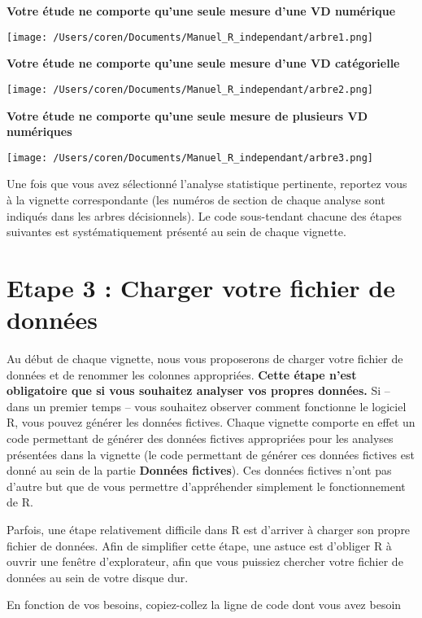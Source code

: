 \documentclass[
]{book}
\begin{document}
\textbf{Votre étude ne comporte qu'une seule mesure d'une VD numérique}

\texttt{[image: /Users/coren/Documents/Manuel\_R\_independant/arbre1.png]}

\textbf{Votre étude ne comporte qu'une seule mesure d'une VD catégorielle}

\texttt{[image: /Users/coren/Documents/Manuel\_R\_independant/arbre2.png]}

\textbf{Votre étude ne comporte qu'une seule mesure de plusieurs VD numériques}

\texttt{[image: /Users/coren/Documents/Manuel\_R\_independant/arbre3.png]}

Une fois que vous avez sélectionné l'analyse statistique pertinente, reportez vous à la vignette correspondante (les numéros de section de chaque analyse sont indiqués dans les arbres décisionnels).
Le code sous-tendant chacune des étapes suivantes est systématiquement présenté au sein de chaque vignette.

\hypertarget{etape-3-charger-votre-fichier-de-donnuxe9es}{%
\section{Etape 3 : Charger votre fichier de données}\label{etape-3-charger-votre-fichier-de-donnuxe9es}}

Au début de chaque vignette, nous vous proposerons de charger votre fichier de données et de renommer les colonnes appropriées. \textbf{Cette étape n'est obligatoire que si vous souhaitez analyser vos propres données.} Si -- dans un premier temps -- vous souhaitez observer comment fonctionne le logiciel R, vous pouvez générer les données fictives. Chaque vignette comporte en effet un code permettant de générer des données fictives appropriées pour les analyses présentées dans la vignette (le code permettant de générer ces données fictives est donné au sein de la partie \textbf{Données fictives}). Ces données fictives n'ont pas d'autre but que de vous permettre d'appréhender simplement le fonctionnement de R.

Parfois, une étape relativement difficile dans R est d'arriver à charger son propre fichier de données. Afin de simplifier cette étape, une astuce est d'obliger R à ouvrir une fenêtre d'explorateur, afin que vous puissiez chercher votre fichier de données au sein de votre disque dur.

En fonction de vos besoins, copiez-collez la ligne de code dont vous avez besoin
\end{document}
